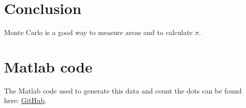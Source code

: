 \documentclass{article}
\begin{document}
\section{Conclusion}
Monte Carlo is a good way to measure areas and to calculate $\pi$.
\section{Matlab code}
The Matlab code used to generate this data and count the dots can be found here: \href{https://github.com/cchan011/Adv-lab/blob/main/Adv%20lab%202/problem%20set%201/matlab%20code%20pset1}{GitHub}.
\end{document}
